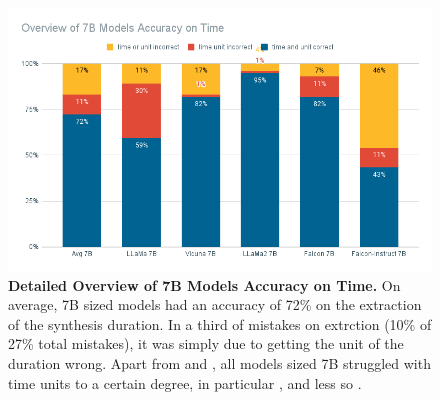 \begin{figure}[!htb]
    \begin{centering}
        \includegraphics[width=\textwidth]{img/overview_7b_time}
        \caption[7B Models Detailed Time Accuracy]{\textbf{Detailed Overview of 7B Models Accuracy on Time.}
            On average, 7B sized models had an accuracy of 72\% on the extraction of the synthesis duration.
            In a third of mistakes on \ttime extrction (10\% of 27\% total mistakes), it was simply due to getting the unit of the duration wrong.
            Apart from  and , all models sized 7B struggled with time units to a certain degree, in particular , and less so .
        }
        \label{fig:7b_time}
    \end{centering}
\end{figure}
